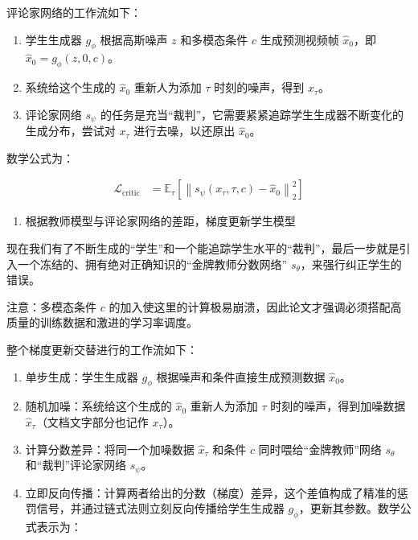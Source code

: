 评论家网络的工作流如下：

\begin{enumerate}
\def\labelenumi{\arabic{enumi}.}
\tightlist
\item
  学生生成器 \(g_\phi\) 根据高斯噪声 \(z\) 和多模态条件 \(c\) 生成预测视频帧 \(\hat{x}_0\)，即 \(\hat{x}_0=g_\phi(z,0,c)\)。
\item
  系统给这个生成的 \(\hat{x}_0\) 重新人为添加 \(\tau\) 时刻的噪声，得到 \(x_\tau\)。
\item
  评论家网络 \(s_\psi\) 的任务是充当``裁判''，它需要紧紧追踪学生生成器不断变化的生成分布，尝试对 \(x_\tau\) 进行去噪，以还原出 \(\hat{x}_0\)。
\end{enumerate}

数学公式为：

\[
\begin{aligned}
\mathcal{L}_{\mathrm{critic}}
&=\mathbb{E}_{\tau}\left[\left\|s_\psi(x_\tau,\tau,c)-\hat{x}_0\right\|_2^2\right]
\end{aligned}
\]

\begin{enumerate}
\def\labelenumi{\arabic{enumi}.}
\setcounter{enumi}{1}
\tightlist
\item
  根据教师模型与评论家网络的差距，梯度更新学生模型
\end{enumerate}

现在我们有了不断生成的``学生''和一个能追踪学生水平的``裁判''，最后一步就是引入一个冻结的、拥有绝对正确知识的``金牌教师分数网络'' \(s_\theta\)，来强行纠正学生的错误。

注意：多模态条件 \(c\) 的加入使这里的计算极易崩溃，因此论文才强调必须搭配高质量的训练数据和激进的学习率调度。

整个梯度更新交替进行的工作流如下：

\begin{enumerate}
\def\labelenumi{\arabic{enumi}.}
\tightlist
\item
  单步生成：学生生成器 \(g_\phi\) 根据噪声和条件直接生成预测数据 \(\hat{x}_0\)。
\item
  随机加噪：系统给这个生成的 \(\hat{x}_0\) 重新人为添加 \(\tau\) 时刻的噪声，得到加噪数据 \(\hat{x}_\tau\)（文档文字部分也记作 \(x_\tau\)）。
\item
  计算分数差异：将同一个加噪数据 \(\hat{x}_\tau\) 和条件 \(c\) 同时喂给``金牌教师''网络 \(s_\theta\) 和``裁判''评论家网络 \(s_\psi\)。
\item
{}
  立即反向传播：计算两者给出的分数（梯度）差异，这个差值构成了精准的惩罚信号，并通过链式法则立刻反向传播给学生生成器 \(g_\phi\)，更新其参数。数学公式表示为：
\end{enumerate}

